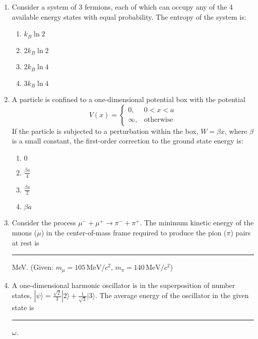 \documentclass[journal]{IEEEtran}
\begin{document}
\begin{enumerate}
    \item Consider a system of 3 fermions, each of which can occupy any of the 4 available energy states with equal probability. The entropy of the system is:
    
    \begin{multicols}{4}
    \begin{enumerate}
        \item $k_B \ln 2$
        \item $2 k_B \ln 2$
        \item $2 k_B \ln 4$
        \item $3 k_B \ln 4$
    \end{enumerate}
    \end{multicols}

    \item A particle is confined to a one-dimensional potential box with the potential
    \[
    V(x) = 
    \begin{cases}
        0, & 0 < x < a \\
        \infty, & \text{otherwise}
    \end{cases}
    \]
    If the particle is subjected to a perturbation within the box, $W = \beta x$, where $\beta$ is a small constant, the first-order correction to the ground state energy is:
    
    \begin{multicols}{2}
    \begin{enumerate}
        \item $0$
        \item $\frac{\beta a}{4}$
        \item $\frac{\beta a}{2}$
        \item $\beta a$
    \end{enumerate}
    \end{multicols}


    \item Consider the process $\mu^- + \mu^+ \rightarrow \pi^- + \pi^+$. The minimum kinetic energy of the muons ($\mu$) in the center-of-mass frame required to produce the pion ($\pi$) pairs at rest is \rule{1cm}{0.15mm} MeV. (Given: $m_\mu = 105 \, \text{MeV}/c^2$, $m_\pi = 140 \, \text{MeV}/c^2$)


    \item A one-dimensional harmonic oscillator is in the superposition of number states, $|\psi\rangle = \frac{\sqrt{2}}{3}|2\rangle + \frac{1}{\sqrt{3}}|3\rangle$. The average energy of the oscillator in the given state is \rule{1cm}{0.15mm} $\omega$.


\end{enumerate}
\end{document}
